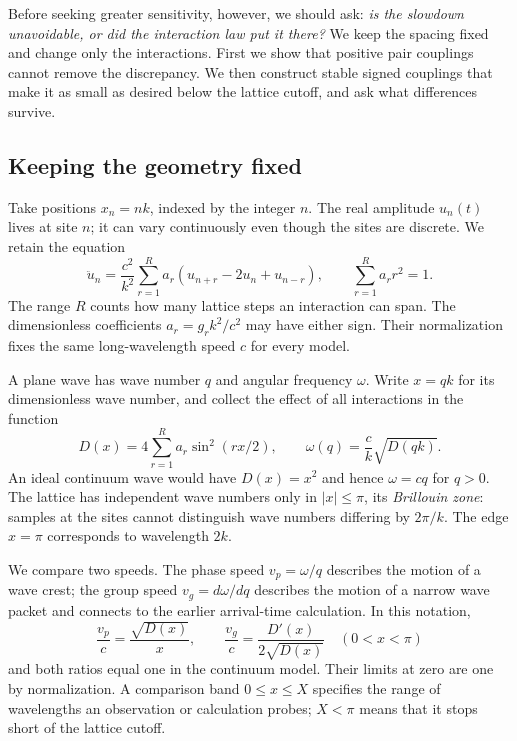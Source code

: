 \documentclass[11pt]{article}
\begin{document}
Before seeking greater sensitivity, however, we should ask: \emph{is the slowdown unavoidable, or did the interaction law put it there?} We keep the spacing fixed and change only the interactions. First we show that positive pair couplings cannot remove the discrepancy. We then construct stable signed couplings that make it as small as desired below the lattice cutoff, and ask what differences survive.

\subsection{Keeping the geometry fixed}
Take positions $x_n=nk$, indexed by the integer $n$. The real amplitude $u_n(t)$ lives at site $n$; it can vary continuously even though the sites are discrete. We retain the equation
\begin{equation}
 \ddot u_n=\frac{c^2}{k^2}\sum_{r=1}^R a_r
 (u_{n+r}-2u_n+u_{n-r}),\qquad \sum_{r=1}^R a_r r^2=1.
\end{equation}
The range $R$ counts how many lattice steps an interaction can span. The dimensionless coefficients $a_r=g_r k^2/c^2$ may have either sign. Their normalization fixes the same long-wavelength speed $c$ for every model.

A plane wave has wave number $q$ and angular frequency $\omega$. Write $x=qk$ for its dimensionless wave number, and collect the effect of all interactions in the function
\begin{equation}\label{symbol}
 D(x)=4\sum_{r=1}^R a_r\sin^2(rx/2),\qquad
 \omega(q)=\frac{c}{k}\sqrt{D(qk)}.
\end{equation}
An ideal continuum wave would have $D(x)=x^2$ and hence $\omega=cq$ for $q>0$. The lattice has independent wave numbers only in $|x|\leq\pi$, its \emph{Brillouin zone}: samples at the sites cannot distinguish wave numbers differing by $2\pi/k$. The edge $x=\pi$ corresponds to wavelength $2k$.

We compare two speeds. The phase speed $v_p=\omega/q$ describes the motion of a wave crest; the group speed $v_g=d\omega/dq$ describes the motion of a narrow wave packet and connects to the earlier arrival-time calculation. In this notation,
\begin{equation}
 \frac{v_p}{c}=\frac{\sqrt{D(x)}}{x},\qquad
 \frac{v_g}{c}=\frac{D'(x)}{2\sqrt{D(x)}}\quad (0<x<\pi)
\end{equation}
and both ratios equal one in the continuum model. Their limits at zero are one by normalization. A comparison band $0\leq x\leq X$ specifies the range of wavelengths an observation or calculation probes; $X<\pi$ means that it stops short of the lattice cutoff.
\end{document}

